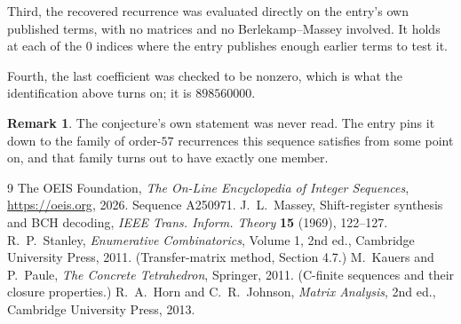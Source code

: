 \documentclass[11pt,a4paper]{article}
\theoremstyle{plain}
\theoremstyle{definition}
\newtheorem{remark}[theorem]{Remark}
\begin{document}
Third, the recovered recurrence was evaluated directly on the entry's own published terms, with
no matrices and no Berlekamp--Massey involved. It holds at each of the $0$ indices where
the entry publishes enough earlier terms to test it.

Fourth, the last coefficient was checked to be nonzero, which is what the identification above
turns on; it is $898560000$.

\begin{remark}
The conjecture's own statement was never read. The entry pins it down to the family of
order-$57$ recurrences this sequence satisfies from some point on, and that family turns
out to have exactly one member.
\end{remark}

\begin{thebibliography}{9}
 The OEIS Foundation, \emph{The On-Line Encyclopedia of Integer
Sequences}, \url{https://oeis.org}, 2026. Sequence A250971.
 J.~L.~Massey, Shift-register synthesis and BCH decoding, \emph{IEEE
Trans. Inform. Theory} \textbf{15} (1969), 122--127.
 R.~P.~Stanley, \emph{Enumerative Combinatorics}, Volume 1, 2nd ed.,
Cambridge University Press, 2011. (Transfer-matrix method, Section 4.7.)
 M.~Kauers and P.~Paule, \emph{The Concrete Tetrahedron}, Springer, 2011.
(C-finite sequences and their closure properties.)
 R.~A.~Horn and C.~R.~Johnson, \emph{Matrix Analysis}, 2nd ed., Cambridge
University Press, 2013.
\end{thebibliography}
\end{document}
